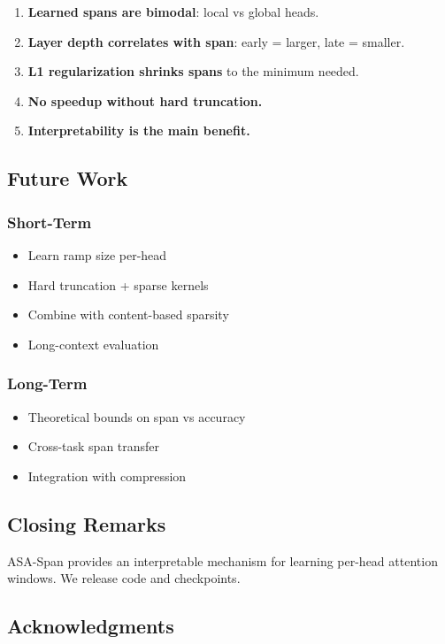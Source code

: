 \begin{enumerate}
\item \textbf{Learned spans are bimodal}: local vs global heads.
\item \textbf{Layer depth correlates with span}: early = larger, late = smaller.
\item \textbf{L1 regularization shrinks spans} to the minimum needed.
\item \textbf{No speedup without hard truncation.}
\item \textbf{Interpretability is the main benefit.}

\end{enumerate}
\subsection{Future Work}

\subsubsection{Short-Term}
\begin{itemize}
\item Learn ramp size per-head
\item Hard truncation + sparse kernels
\item Combine with content-based sparsity
\item Long-context evaluation

\end{itemize}
\subsubsection{Long-Term}
\begin{itemize}
\item Theoretical bounds on span vs accuracy
\item Cross-task span transfer
\item Integration with compression

\end{itemize}
\subsection{Closing Remarks}

ASA-Span provides an interpretable mechanism for learning per-head attention 
windows. We release code and checkpoints.

\subsection{Acknowledgments}


